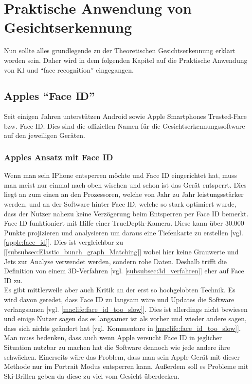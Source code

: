 \section{Praktische Anwendung von Gesichtserkennung}
\label{sec:Praltische_Anwendung_Kuenslicher_Intelligenz}

    Nun sollte alles grundlegende zu der Theoretischen Gesichtserkennung erklärt worden sein. Daher wird in dem folgenden Kapitel auf die Praktische Anwendung von KI und \enquote{face recognition} eingegangen.

    \subsection{Apples \enquote{Face ID}}
    \label{subsec:FaceID_TrustedFace}
        Seit einigen Jahren unterstützen Android sowie Apple Smartphones Trusted-Face bzw. Face ID. Dies sind die offiziellen Namen für die Gesichtserkennungssoftware auf den jeweiligen Geräten.

        \subsubsection{Apples Ansatz mit Face ID}
            Wenn man sein IPhone entsperren möchte und Face ID eingerichtet hat, muss man meist nur einmal nach oben wischen und schon ist das Gerät entsperrt. Dies liegt an zum einen an den Prozessoren, welche von Jahr zu Jahr leistungsstärker werden, und an der Software hinter Face ID, welche so stark optimiert wurde, dass der Nutzer nahezu keine Verzögerung beim Entsperren per Face ID bemerkt.\\
            Face ID funktioniert mit Hilfe einer TrueDepth-Kamera. Diese kann über 30.000 Punkte projizieren und analysieren um daraus eine Tiefenkarte zu erstellen [vgl. \ref{apple:face_id}]. Dies ist vergleichbar zu [\ref{subsubsec:Elastic_bunch_graph_Matching}] wobei hier keine Grauwerte und Jets zur Analyse verwendet werden, sondern rohe Daten. Deshalb trifft die Definition von einem 3D-Verfahren [vgl. \ref{subsubsec:3d_verfahren}] eher auf Face ID zu.\\
            Es gibt mittlerweile aber auch Kritik an der erst so hochgelobten Technik. Es wird davon geredet, dass Face ID zu langsam wäre und Updates die Software verlangsamen [vgl. \ref{maclife:face_id_too_slow}]. Dies ist allerdings nicht bewiesen und einige Nutzer sagen das es langsamer ist als vorher und wieder andere sagen, dass sich nichts geändert hat [vgl. Kommentare in \ref{maclife:face_id_too_slow}]. Man muss bedenken, dass auch wenn Apple versucht Face ID in jeglicher Situation nutzbar zu machen hat die Software dennoch wie jede andere ihre schwächen. Einerseits wäre das Problem, dass man sein Apple Gerät mit dieser Methode nur im Portrait Modus entsperren kann. Außerdem soll es Probleme mit Ski-Brillen geben da diese zu viel vom Gesicht überdecken.

